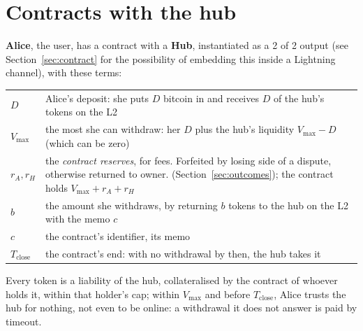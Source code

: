 \documentclass[11pt]{article}
\newcommand{\vmax}{V_{\max}}
\newcommand{\Tc}{T_{\mathrm{close}}}
\begin{document}

\section{Contracts with the hub}
\label{sec:terms}

\textbf{Alice}, the user, has a contract with a \textbf{Hub}, instantiated as a 2 of 2 output  (see Section~\ref{sec:contract} for the possibility of embedding this inside a Lightning channel), with these terms:
\begin{center}
\small
\begin{tabularx}{\linewidth}{p{16mm}L}
\toprule
$D$ & Alice's deposit: she puts $D$ bitcoin in and receives $D$ of the hub's tokens on the L2 \\
$\vmax$ & the most she can withdraw: her $D$ plus the hub's liquidity $\vmax - D$ (which can be zero)\\
$r_A, r_H$ & the \emph{contract reserves}, for fees. Forfeited by losing side of a dispute, otherwise returned to owner. (Section~\ref{sec:outcomes}); the contract holds $\vmax + r_A + r_H$ \\
$b$ & the amount she withdraws, by returning $b$ tokens to the hub on the L2 with the memo $c$ \\
$c$ & the contract's identifier, its memo \\
$\Tc$ & the contract's end: with no withdrawal by then, the hub takes it \\
\bottomrule
\end{tabularx}
\end{center}
Every token is a liability of the hub, collateralised by the contract of whoever holds it, within that holder's cap; within $\vmax$ and before $\Tc$, Alice trusts the hub for nothing, not even to be online: a withdrawal it does not answer is paid by timeout.
\end{document}
